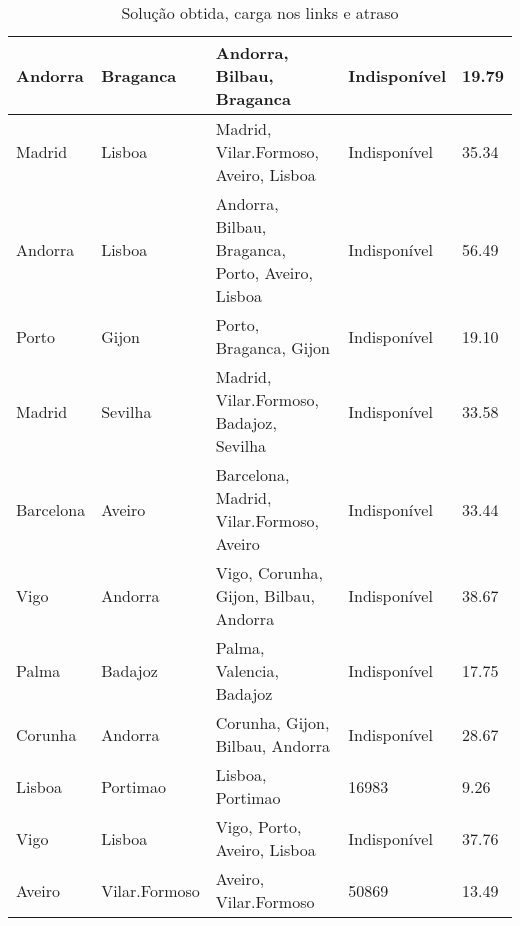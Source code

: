 \begin{table}[!htb]
{\begin{tabular}{|l|l|l|l|l|}
Andorra & Braganca & Andorra, Bilbau, Braganca & Indisponível & 19.79 \\ \hline
Madrid & Lisboa & Madrid, Vilar.Formoso, Aveiro, Lisboa & Indisponível & 35.34 \\ \hline
Andorra & Lisboa & Andorra, Bilbau, Braganca, Porto, Aveiro, Lisboa & Indisponível & 56.49 \\ \hline
Porto & Gijon & Porto, Braganca, Gijon & Indisponível & 19.10 \\ \hline
Madrid & Sevilha & Madrid, Vilar.Formoso, Badajoz, Sevilha & Indisponível & 33.58 \\ \hline
Barcelona & Aveiro & Barcelona, Madrid, Vilar.Formoso, Aveiro & Indisponível & 33.44 \\ \hline
Vigo & Andorra & Vigo, Corunha, Gijon, Bilbau, Andorra & Indisponível & 38.67 \\ \hline
Palma & Badajoz & Palma, Valencia, Badajoz & Indisponível & 17.75 \\ \hline
Corunha & Andorra & Corunha, Gijon, Bilbau, Andorra & Indisponível & 28.67 \\ \hline
Lisboa & Portimao & Lisboa, Portimao & 16983 & 9.26 \\ \hline
Vigo & Lisboa & Vigo, Porto, Aveiro, Lisboa & Indisponível & 37.76 \\ \hline
Aveiro & Vilar.Formoso & Aveiro, Vilar.Formoso & 50869 & 13.49 \\ \hline
\end{tabular}}
\caption[]{Solução obtida, carga nos links e atraso}
\end{table}

